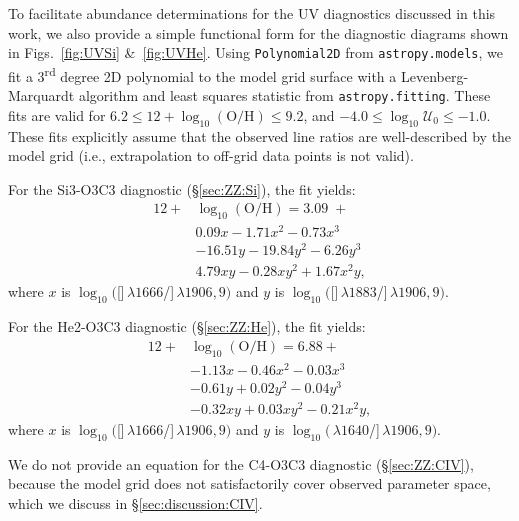 \documentclass[trackchanges, preprint2]{aastex62}
\newcommand{\oiii}{[\ion{O}{3}]}
\newcommand{\heii}{\ion{He}{2}}
\newcommand{\SiuIII}{[\ion{Si}{3}]}
\newcommand{\ciii}{\ion{C}{3}]}
\newcommand{\logten}{\ensuremath{\log_{10}}}
\newcommand{\logOH}{\ensuremath{\logten (\mathrm{O}/\mathrm{H})}\xspace}
\newcommand{\logU}{\ensuremath{\logten \mathcal{U}_0}}
\begin{document}
To facilitate abundance determinations for the UV diagnostics discussed in this work, we also provide a simple functional form for the diagnostic diagrams shown in Figs.~\ref{fig:UVSi} \&~\ref{fig:UVHe}. Using {\tt Polynomial2D} from {\tt astropy.models}, we fit a 3\textsuperscript{rd} degree 2D polynomial to the model grid surface with a Levenberg-Marquardt algorithm and least squares statistic from {\tt astropy.fitting}. These fits are valid for $6.2 \leq 12+\logOH \leq 9.2$, and $-4.0 \leq \logU \leq -1.0$. These fits explicitly assume that the observed line ratios are well-described by the model grid (i.e., extrapolation to off-grid data points is not valid).

For the Si3-O3C3 diagnostic (\S\ref{sec:ZZ:Si}), the fit yields:
\begin{equation}\begin{aligned}\label{eq:polySi}
    12+&\logOH = 3.09\;+\\
    &0.09x -1.71x^2 -0.73x^{3}\\
    &-16.51y -19.84y^{2} -6.26y^{3}\\
    &4.79xy -0.28xy^{2} +1.67x^{2}y,
\end{aligned}\end{equation}
where $x$ is $\log_{10}($\oiii$\,\lambda1666$/\ciii$\,\lambda1906,9)$ and $y$ is $\log_{10}($\SiuIII$\,\lambda1883$/\ciii$\,\lambda1906,9)$.

For the He2-O3C3 diagnostic (\S\ref{sec:ZZ:He}), the fit yields:
\begin{equation}\begin{aligned}\label{eq:polyHe}
    12+&\logOH = 6.88 +\\
    &-1.13x -0.46x^2 -0.03x^{3}\\
    &-0.61y +0.02y^{2} -0.04y^{3}\\
    &-0.32xy +0.03xy^{2} -0.21x^{2}y,
\end{aligned}\end{equation}
where $x$ is $\log_{10}($\oiii$\,\lambda1666$/\ciii$\,\lambda1906,9)$ and $y$ is $\log_{10}($\heii$\,\lambda1640$/\ciii$\,\lambda1906,9)$.

We do not provide an equation for the C4-O3C3 diagnostic (\S\ref{sec:ZZ:CIV}), because the model grid does not satisfactorily cover observed parameter space, which we discuss in \S\ref{sec:discussion:CIV}.
\end{document}
